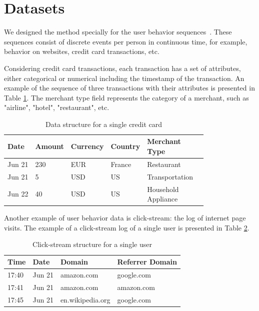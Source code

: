 \documentclass[sigconf]{acmart}
\begin{document}
\section{Datasets} \label{app-sec-datasets}

We designed the method specially for the user behavior sequences~\citep{Ni2018PerceiveYU}. These sequences consist of discrete events per person in continuous time, for example,  behavior on websites, credit card transactions, etc. 

Considering credit card transactions, each transaction has a set of attributes, either categorical or numerical including the timestamp of the transaction. An example of the sequence of three transactions with their attributes is presented in Table \ref{tab-tr-data}.
The merchant type field represents the category of a merchant, such as "airline", "hotel", "restaurant", etc.

\begin{table}
\centering
\caption{Data structure for a single credit card}
\begin{tabular}{llllll}
\toprule
\textbf{Date} & \textbf{Amount} & \textbf{Currency} & \textbf{Country} & \makecell{\textbf{Merchant} \\ \textbf{Type}} \\
\midrule
Jun 21 & 230 & EUR & France & Restaurant \\
Jun 21 & 5 & USD & US & Transportation \\
Jun 22 & 40 & USD & US & \makecell[l]{Household \\ Appliance} \\
\bottomrule
\end{tabular}
\label{tab-tr-data}
\end{table}

Another example of user behavior data is click-stream: the log of internet page visits. The example of a click-stream log of a single user is presented in Table \ref{tab-cs-data}.

\begin{table}
\centering
\caption{Click-stream structure for a single user}
\begin{tabular}{llll}
\toprule
\textbf{Time} & \textbf{Date} & \textbf{Domain} & \textbf{Referrer Domain} \\
\midrule
17:40 & Jun 21 & amazon.com & google.com \\
17:41 & Jun 21 & amazon.com & amazon.com \\
17:45 & Jun 21 & en.wikipedia.org & google.com \\
\bottomrule
\end{tabular}
\label{tab-cs-data}
\end{table}
\end{document}
